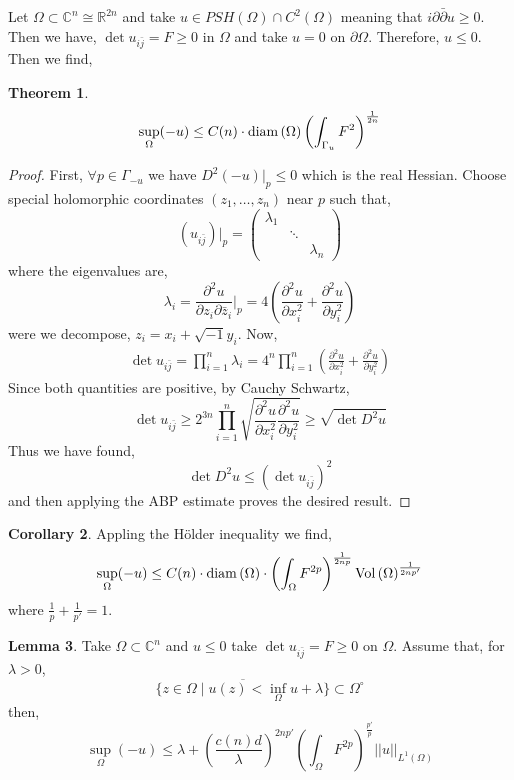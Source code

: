 \documentclass[12pt]{extarticle}
\newcommand{\R}{\mathbb{R}}
\newcommand{\C}{\mathbb{C}}
\theoremstyle{definition}
\newtheorem{theorem}{Theorem}[section]
\newtheorem{lemma}[theorem]{Lemma}
\newtheorem{corollary}[theorem]{Corollary}
\begin{document}
Let $\Omega \subset \C^n \cong \R^{2n}$ and take $u \in PSH(\Omega) \cap C^2(\Omega)$ meaning that $i \partial \bar{\partial} u \ge 0$. Then we have, $\det{u_{i \bar{j}}} = F \ge 0$ in $\Omega$ and take $u = 0$ on $\partial \Omega$. Therefore, $u \le 0$. Then we find,
\begin{theorem}
\[ \sup\limits_{\Omega}(-u) \le C(n) \cdot \mathrm{diam}\left(\Omega\right) \left( \int_{\Gamma_u} F^2 \right)^{\frac{1}{2n}} \]
\end{theorem}

\begin{proof}
First, $\forall p \in \Gamma_{-u}$ we have $D^2(-u)|_p \le 0$ which is the real Hessian. Choose special holomorphic coordinates $(z_1, \dots, z_n)$ near $p$ such that,
\[ (u_{i \bar{j}})|_p = 
\begin{pmatrix}
\lambda_1 & &  
\\
& \ddots & 
\\
& & \lambda_n
\end{pmatrix} \]
where the eigenvalues are,
\[ \lambda_i = \frac{\partial^2 u}{\partial z_i \partial \bar{z}_i} \bigg|_p = 4 \left( \frac{\partial^2 u}{\partial x_i^2} + \frac{\partial^2 u}{\partial y_i^2} \right) \]
were we decompose, $z_i = x_i + \sqrt{-1} y_i$. Now,
\begin{align*}
\det{u_{i \bar{j}}} = \prod_{i = 1}^n \lambda_i = 4^n \prod_{i = 1}^n  \left( \frac{\partial^2 u}{\partial x_i^2} + \frac{\partial^2 u}{\partial y_i^2} \right)
\end{align*}
Since both quantities are positive, by Cauchy Schwartz,
\[ \det{u_{i \bar{j}}} \ge 2^{3n} \prod_{i = 1}^n \sqrt{\frac{\partial^2 u}{\partial x_i^2} \frac{\partial^2 u}{\partial y_i^2}} \ge \sqrt{\det{D^2 u}} \]
Thus we have found,
\[ \det{D^2 u} \le ( \det{u_{i \bar{j}}} )^2 \]
and then applying the ABP estimate proves the desired result.   
\end{proof}

\begin{corollary}
Appling the H\"{o}lder inequality we find,
\[ \sup\limits_{\Omega}(-u) \le C(n) \cdot  \mathrm{diam}\left(\Omega\right) \cdot \left( \int_{\Omega} F^{2 p} \right)^{\frac{1}{2 n p}} \mathrm{Vol}\left(\Omega\right)^\frac{1}{2 n p'} \]
where $\frac{1}{p} + \frac{1}{p'} = 1$. 
\end{corollary}

\begin{lemma}
Take $\Omega \subset \C^n$ and $u \le 0$ take $\det{u_{i\bar{j}}} = F \ge 0$ on $\Omega$. Assume that, for $\lambda > 0$, 
\[ \overline{\{ z \in \Omega \mid u(z) < \inf\limits_{\Omega} u + \lambda \}} \subset \Omega^\circ \]
then,
\[ \sup\limits_{\Omega}(-u) \le \lambda + \left( \frac{c(n) d}{\lambda} \right)^{2n p'} \left( \int_\Omega  F^{2 p} \right)^{\frac{p'}{p}} || u ||_{L^1(\Omega)} \]
\end{lemma}
\end{document}
